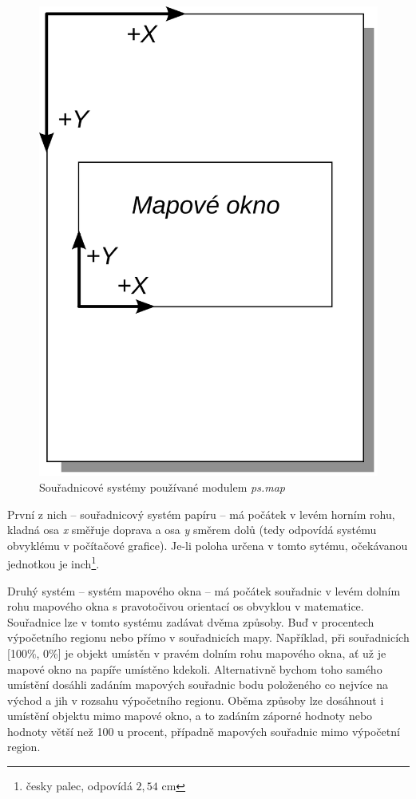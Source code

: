 \documentclass[a4paper,12pt,draft]{article}
\newcommand{\modul}[1]{\emph{#1}}
\begin{document}
\begin{figure}[h!]
    \centering
    \includegraphics[width=0.2\textheight]{./sour_systemy.pdf}
    \caption{Souřadnicové systémy používané modulem \modul{ps.map}\label{fig:sour_systemy}}
\end{figure}


První z nich -- souřadnicový systém papíru -- má počátek v levém horním rohu, kladná osa \emph{x} směřuje doprava a osa \emph{y} směrem dolů (tedy odpovídá systému obvyklému v počítačové grafice). 
Je-li poloha určena v tomto sytému, očekávanou jednotkou je inch\footnote{ česky palec, odpovídá $2{},54$ cm}.

Druhý systém -- systém mapového okna -- má počátek souřadnic v levém dolním rohu mapového okna s pravotočivou orientací os obvyklou v matematice. Souřadnice lze v tomto systému zadávat dvěma způsoby. Buď v procentech výpočetního regionu nebo přímo v souřadnicích mapy. Například, při souřadnicích [100\%, 0\%] je objekt umístěn v pravém dolním rohu mapového okna, ať už je mapové okno na papíře umístěno kdekoli. Alternativně bychom toho samého umístění dosáhli zadáním mapových souřadnic bodu položeného co nejvíce na východ a jih v rozsahu výpočetního regionu. Oběma způsoby lze dosáhnout i umístění objektu mimo mapové okno, a to zadáním záporné hodnoty nebo hodnoty větší než 100 u procent, případně mapových souřadnic mimo výpočetní region.
\end{document}
